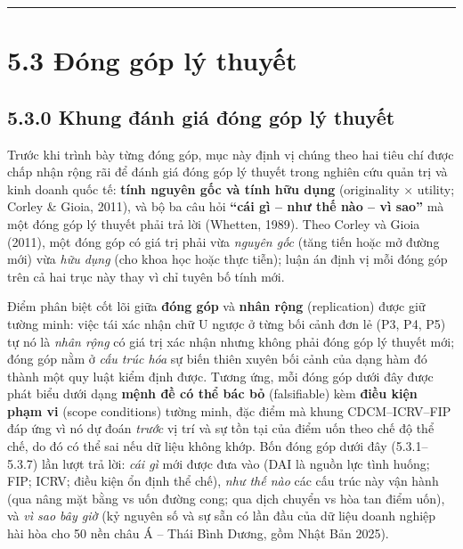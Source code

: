 \documentclass[
  a4paper,
  13pt]{extreport}
\begin{document}
\begin{center}\rule{0.5\linewidth}{0.5pt}\end{center}

\hypertarget{ux111uxf3ng-guxf3p-luxfd-thuyux1ebft-1}{%
\section{5.3 Đóng góp lý
thuyết}\label{ux111uxf3ng-guxf3p-luxfd-thuyux1ebft-1}}

\hypertarget{khung-ux111uxe1nh-giuxe1-ux111uxf3ng-guxf3p-luxfd-thuyux1ebft}{%
\subsection{5.3.0 Khung đánh giá đóng góp lý
thuyết}\label{khung-ux111uxe1nh-giuxe1-ux111uxf3ng-guxf3p-luxfd-thuyux1ebft}}

Trước khi trình bày từng đóng góp, mục này định vị chúng theo hai tiêu
chí được chấp nhận rộng rãi để đánh giá đóng góp lý thuyết trong nghiên
cứu quản trị và kinh doanh quốc tế: \textbf{tính nguyên gốc và tính hữu
dụng} (originality × utility; Corley \& Gioia, 2011), và bộ ba câu hỏi
\textbf{``cái gì -- như thế nào -- vì sao''} mà một đóng góp lý thuyết
phải trả lời (Whetten, 1989). Theo Corley và Gioia (2011), một đóng góp
có giá trị phải vừa \emph{nguyên gốc} (tăng tiến hoặc mở đường mới) vừa
\emph{hữu dụng} (cho khoa học hoặc thực tiễn); luận án định vị mỗi đóng
góp trên cả hai trục này thay vì chỉ tuyên bố tính mới.

Điểm phân biệt cốt lõi giữa \textbf{đóng góp} và \textbf{nhân rộng}
(replication) được giữ tường minh: việc tái xác nhận chữ U ngược ở từng
bối cảnh đơn lẻ (P3, P4, P5) tự nó là \emph{nhân rộng} có giá trị xác
nhận nhưng không phải đóng góp lý thuyết mới; đóng góp nằm ở \emph{cấu
trúc hóa} sự biến thiên xuyên bối cảnh của dạng hàm đó thành một quy
luật kiểm định được. Tương ứng, mỗi đóng góp dưới đây được phát biểu
dưới dạng \textbf{mệnh đề có thể bác bỏ} (falsifiable) kèm \textbf{điều
kiện phạm vi} (scope conditions) tường minh, đặc điểm mà khung
CDCM--ICRV--FIP đáp ứng vì nó dự đoán \emph{trước} vị trí và sự tồn tại
của điểm uốn theo chế độ thể chế, do đó có thể sai nếu dữ liệu không
khớp. Bốn đóng góp dưới đây (5.3.1--5.3.7) lần lượt trả lời: \emph{cái
gì} mới được đưa vào (DAI là nguồn lực tình huống; FIP; ICRV; điều kiện
ổn định thể chế), \emph{như thế nào} các cấu trúc này vận hành (qua nâng
mặt bằng vs uốn đường cong; qua dịch chuyển vs hòa tan điểm uốn), và
\emph{vì sao bây giờ} (kỷ nguyên số và sự sẵn có lần đầu của dữ liệu
doanh nghiệp hài hòa cho 50 nền châu Á -- Thái Bình Dương, gồm Nhật Bản
2025).
\end{document}
